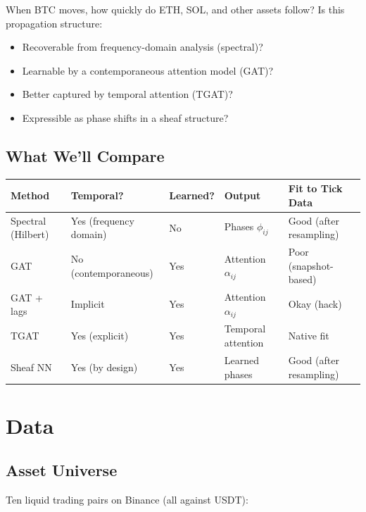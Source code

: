 \documentclass[11pt, a4paper]{article}
\begin{document}
When BTC moves, how quickly do ETH, SOL, and other assets follow? Is this propagation structure:
\begin{itemize}
    \item Recoverable from frequency-domain analysis (spectral)?
    \item Learnable by a contemporaneous attention model (GAT)?
    \item Better captured by temporal attention (TGAT)?
    \item Expressible as phase shifts in a sheaf structure?
\end{itemize}

\subsection{What We'll Compare}

\begin{center}
\begin{tabular}{lllll}
\toprule
\textbf{Method} & \textbf{Temporal?} & \textbf{Learned?} & \textbf{Output} & \textbf{Fit to Tick Data} \\
\midrule
Spectral (Hilbert) & Yes (frequency domain) & No & Phases $\phi_{ij}$ & Good (after resampling) \\
GAT & No (contemporaneous) & Yes & Attention $\alpha_{ij}$ & Poor (snapshot-based) \\
GAT + lags & Implicit & Yes & Attention $\alpha_{ij}$ & Okay (hack) \\
TGAT & Yes (explicit) & Yes & Temporal attention & Native fit \\
Sheaf NN & Yes (by design) & Yes & Learned phases & Good (after resampling) \\
\bottomrule
\end{tabular}
\end{center}

\section{Data}

\subsection{Asset Universe}

Ten liquid trading pairs on Binance (all against USDT):
\end{document}
